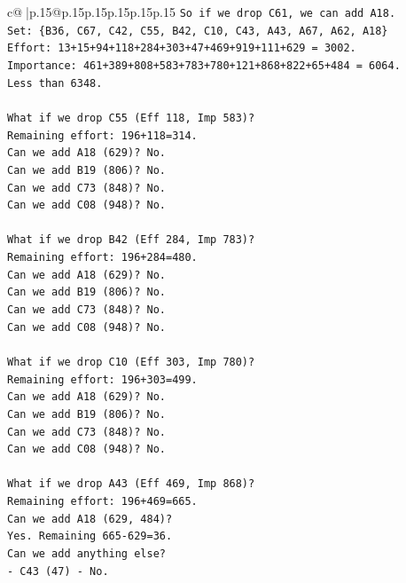 \documentclass{article}
\begin{document}
{\begin{supertabular}{c@{$\;$}|p{.15\linewidth}@{}p{.15\linewidth}p{.15\linewidth}p{.15\linewidth}p{.15\linewidth}p{.15\linewidth}}
{{{\texttt{So if we drop C61, we can add A18.} \\
\texttt{Set: \{B36, C67, C42, C55, B42, C10, C43, A43, A67, A62, A18\}} \\
\texttt{Effort: 13+15+94+118+284+303+47+469+919+111+629 = 3002.} \\
\texttt{Importance: 461+389+808+583+783+780+121+868+822+65+484 = 6064.} \\
\texttt{Less than 6348.} \\
\\ 
\texttt{What if we drop C55 (Eff 118, Imp 583)?} \\
\texttt{Remaining effort: 196+118=314.} \\
\texttt{Can we add A18 (629)? No.} \\
\texttt{Can we add B19 (806)? No.} \\
\texttt{Can we add C73 (848)? No.} \\
\texttt{Can we add C08 (948)? No.} \\
\\ 
\texttt{What if we drop B42 (Eff 284, Imp 783)?} \\
\texttt{Remaining effort: 196+284=480.} \\
\texttt{Can we add A18 (629)? No.} \\
\texttt{Can we add B19 (806)? No.} \\
\texttt{Can we add C73 (848)? No.} \\
\texttt{Can we add C08 (948)? No.} \\
\\ 
\texttt{What if we drop C10 (Eff 303, Imp 780)?} \\
\texttt{Remaining effort: 196+303=499.} \\
\texttt{Can we add A18 (629)? No.} \\
\texttt{Can we add B19 (806)? No.} \\
\texttt{Can we add C73 (848)? No.} \\
\texttt{Can we add C08 (948)? No.} \\
\\ 
\texttt{What if we drop A43 (Eff 469, Imp 868)?} \\
\texttt{Remaining effort: 196+469=665.} \\
\texttt{Can we add A18 (629, 484)?} \\
\texttt{Yes. Remaining 665{-}629=36.} \\
\texttt{Can we add anything else?} \\
\texttt{{-} C43 (47) {-} No.} \\
}}}
\end{supertabular}}
\end{document}
